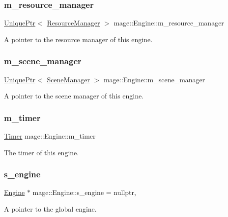 \subsubsection{\texorpdfstring{m\+\_\+resource\+\_\+manager}{m\_resource\_manager}}
{\footnotesize\ttfamily \hyperlink{namespacemage_a3316d7143a973e37adf1110f2e80ca31}{Unique\+Ptr}$<$ \hyperlink{classmage_1_1_resource_manager}{Resource\+Manager} $>$ mage\+::\+Engine\+::m\+\_\+resource\+\_\+manager\hspace{0.3cm}{\ttfamily [private]}}

A pointer to the resource manager of this engine. \hypertarget{classmage_1_1_engine_afac8085ae572d623e77b1e0847440ab4}{}\label{classmage_1_1_engine_afac8085ae572d623e77b1e0847440ab4} 
\subsubsection{\texorpdfstring{m\+\_\+scene\+\_\+manager}{m\_scene\_manager}}
{\footnotesize\ttfamily \hyperlink{namespacemage_a3316d7143a973e37adf1110f2e80ca31}{Unique\+Ptr}$<$ \hyperlink{classmage_1_1_scene_manager}{Scene\+Manager} $>$ mage\+::\+Engine\+::m\+\_\+scene\+\_\+manager\hspace{0.3cm}{\ttfamily [private]}}

A pointer to the scene manager of this engine. \hypertarget{classmage_1_1_engine_a8d1395822cfabf3f7acc97f28d53f231}{}\label{classmage_1_1_engine_a8d1395822cfabf3f7acc97f28d53f231} 
\subsubsection{\texorpdfstring{m\+\_\+timer}{m\_timer}}
{\footnotesize\ttfamily \hyperlink{classmage_1_1_timer}{Timer} mage\+::\+Engine\+::m\+\_\+timer\hspace{0.3cm}{\ttfamily [private]}}

The timer of this engine. \hypertarget{classmage_1_1_engine_a95fd10c9b9dfe0fc9cbbcb441c910240}{}\label{classmage_1_1_engine_a95fd10c9b9dfe0fc9cbbcb441c910240} 
\subsubsection{\texorpdfstring{s\+\_\+engine}{s\_engine}}
{\footnotesize\ttfamily \hyperlink{classmage_1_1_engine}{Engine} $\ast$ mage\+::\+Engine\+::s\+\_\+engine = nullptr\hspace{0.3cm}{\ttfamily [static]}, {\ttfamily [private]}}

A pointer to the global engine. 